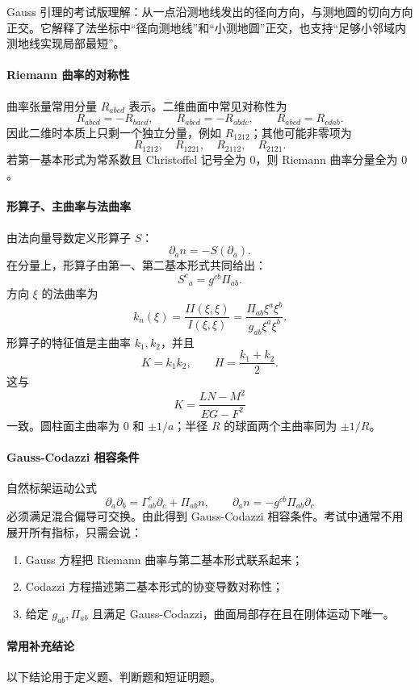 \documentclass[UTF8,12pt,a4paper]{ctexart}
\begin{document}
Gauss 引理的考试版理解：从一点沿测地线发出的径向方向，与测地圆的切向方向正交。它解释了法坐标中“径向测地线”和“小测地圆”正交，也支持“足够小邻域内测地线实现局部最短”。

\paragraph{Riemann 曲率的对称性}
曲率张量常用分量 $R_{abcd}$ 表示。二维曲面中常见对称性为
\[
R_{abcd}=-R_{bacd},\qquad
R_{abcd}=-R_{abdc},\qquad
R_{abcd}=R_{cdab}.
\]
因此二维时本质上只剩一个独立分量，例如 $R_{1212}$；其他可能非零项为
\[
R_{1212},\quad R_{1221},\quad R_{2112},\quad R_{2121}.
\]
若第一基本形式为常系数且 Christoffel 记号全为 $0$，则 Riemann 曲率分量全为 $0$。

\paragraph{形算子、主曲率与法曲率}
由法向量导数定义形算子 $S$：
\[
\partial_an=-S(\partial_a).
\]
在分量上，形算子由第一、第二基本形式共同给出：
\[
S^c{}_a=g^{cb}\Pi_{ab}.
\]
方向 $\xi$ 的法曲率为
\[
k_n(\xi)=\frac{II(\xi,\xi)}{I(\xi,\xi)}
=\frac{\Pi_{ab}\xi^a\xi^b}{g_{ab}\xi^a\xi^b}.
\]
形算子的特征值是主曲率 $k_1,k_2$，并且
\[
K=k_1k_2,\qquad H=\frac{k_1+k_2}{2}.
\]
这与
\[
K=\frac{LN-M^2}{EG-F^2}
\]
一致。圆柱面主曲率为 $0$ 和 $\pm 1/a$；半径 $R$ 的球面两个主曲率同为 $\pm1/R$。

\paragraph{Gauss-Codazzi 相容条件}
自然标架运动公式
\[
\partial_a\partial_b=\Gamma^c_{ab}\partial_c+\Pi_{ab}n,\qquad
\partial_an=-g^{cb}\Pi_{ab}\partial_c
\]
必须满足混合偏导可交换。由此得到 Gauss-Codazzi 相容条件。考试中通常不用展开所有指标，只需会说：
\begin{enumerate}
\item Gauss 方程把 Riemann 曲率与第二基本形式联系起来；
\item Codazzi 方程描述第二基本形式的协变导数对称性；
\item 给定 $g_{ab},\Pi_{ab}$ 且满足 Gauss-Codazzi，曲面局部存在且在刚体运动下唯一。
\end{enumerate}

\paragraph{常用补充结论}
以下结论用于定义题、判断题和短证明题。
\end{document}
